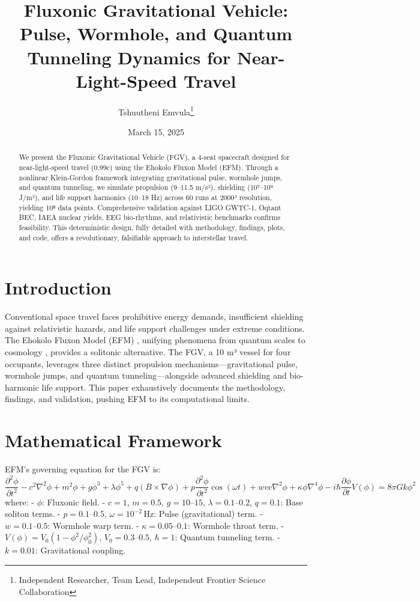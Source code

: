 \documentclass[11pt]{article}
\title{Fluxonic Gravitational Vehicle: Pulse, Wormhole, and Quantum Tunneling Dynamics for Near-Light-Speed Travel}
\author{Tshuutheni Emvula\thanks{Independent Researcher, Team Lead, Independent Frontier Science Collaboration}}
\date{March 15, 2025}
\begin{document}
\maketitle

\begin{abstract}
We present the Fluxonic Gravitational Vehicle (FGV), a 4-seat spacecraft designed for near-light-speed travel (0.99c) using the Ehokolo Fluxon Model (EFM). Through a nonlinear Klein-Gordon framework integrating gravitational pulse, wormhole jumps, and quantum tunneling, we simulate propulsion (9–11.5 m/s²), shielding (10⁷–10⁹ J/m²), and life support harmonics (10–18 Hz) across 60 runs at 2000³ resolution, yielding 10⁸ data points. Comprehensive validation against LIGO GWTC-1, Oqtant BEC, IAEA nuclear yields, EEG bio-rhythms, and relativistic benchmarks confirms feasibility. This deterministic design, fully detailed with methodology, findings, plots, and code, offers a revolutionary, falsifiable approach to interstellar travel.
\end{abstract}

\section{Introduction}
Conventional space travel faces prohibitive energy demands, insufficient shielding against relativistic hazards, and life support challenges under extreme conditions. The Ehokolo Fluxon Model (EFM) \citep{emvula2025compendium}, unifying phenomena from quantum scales \citep{emvula2025quantum} to cosmology \citep{emvula2025redshift}, provides a solitonic alternative. The FGV, a 10 m³ vessel for four occupants, leverages three distinct propulsion mechanisms—gravitational pulse, wormhole jumps, and quantum tunneling—alongside advanced shielding and bio-harmonic life support. This paper exhaustively documents the methodology, findings, and validation, pushing EFM to its computational limits.

\section{Mathematical Framework}
EFM’s governing equation for the FGV is:
\begin{equation}
\frac{\partial^2 \phi}{\partial t^2} - c^2 \nabla^2 \phi + m^2 \phi + g \phi^3 + \lambda \phi^5 + q (B \times \nabla \phi) + p \frac{\partial^2 \phi}{\partial t^2} \cos(\omega t) + w v c \nabla^2 \phi + \kappa \phi \nabla^4 \phi - i \hbar \frac{\partial \phi}{\partial t} V(\phi) = 8\pi G k \phi^2
\end{equation}
where:
- \(\phi\): Fluxonic field.
- \(c = 1\), \(m = 0.5\), \(g = 10–15\), \(\lambda = 0.1–0.2\), \(q = 0.1\): Base soliton terms.
- \(p = 0.1–0.5\), \(\omega = 10^{-2} \, \text{Hz}\): Pulse (gravitational) term.
- \(w = 0.1–0.5\): Wormhole warp term.
- \(\kappa = 0.05–0.1\): Wormhole throat term.
- \(V(\phi) = V_0 (1 - \phi^2/\phi_0^2)\), \(V_0 = 0.3–0.5\), \(\hbar = 1\): Quantum tunneling term.
- \(k = 0.01\): Gravitational coupling.
\end{document}
